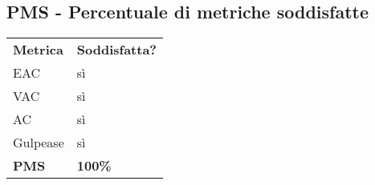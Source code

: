 \subsection{PMS - Percentuale di metriche soddisfatte}
%
\begin{longtable}{ >{\centering}p{} >{\centering}p{}}
	\rowcolorhead
	\textbf{\color{white}Metrica} 
	& \textbf{\color{white}Soddisfatta?} 
	\tabularnewline %
		
	EAC
	& sì
	\tabularnewline %
	VAC
	& sì
	\tabularnewline %
	AC
	& sì
	\tabularnewline %
	Gulpease
	& sì
	\tabularnewline %
	\textbf{PMS}
	& \textbf{100\%}
	\tabularnewline %
\end{longtable}